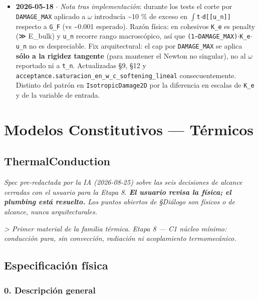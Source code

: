 \documentclass[11pt,letterpaper,oneside]{report}
\begin{document}
\begin{itemize}
  \item \textbf{2026-05-18} \ensuremath{\cdot} \textit{Nota tras implementación}: durante los tests el corte por \texttt{DAMAGE\_MAX} aplicado a \ensuremath{\omega} introducía \textasciitilde{}10 \% de exceso en \texttt{\ensuremath{\int}t\ensuremath{\cdot}d[[u\_n]]} respecto a \texttt{G\_F} (vs \textasciitilde{}0.001 esperado). Razón física: en cohesivos \texttt{K\_e} es penalty (≫ E\_bulk) y \texttt{u\_n} recorre rango macroscópico, así que \texttt{(1−DAMAGE\_MAX)\ensuremath{\cdot}K\_e\ensuremath{\cdot}u\_n} no es despreciable. Fix arquitectural: el cap por \texttt{DAMAGE\_MAX} se aplica \textbf{sólo a la rigidez tangente} (para mantener el Newton no singular), no al \texttt{\ensuremath{\omega}} reportado ni a \texttt{t\_n}. Actualizadas §9, §12 y \texttt{acceptance.saturacion\_en\_w\_c\_softening\_lineal} consecuentemente. Distinto del patrón en \texttt{IsotropicDamage2D} por la diferencia en escalas de \texttt{K\_e} y de la variable de entrada.
\end{itemize}


\newpage

\chapter{Modelos Constitutivos — Térmicos}

\section{ThermalConduction}



\textit{Spec pre-redactada por la IA (2026-08-25) sobre las seis decisiones de alcance cerradas con el usuario para la Etapa 8. \textbf{El usuario revisa la física; el plumbing está resuelto.} Los puntos abiertos de §Diálogo son físicos o de alcance, nunca arquitecturales.}

\textit{> Primer material de la familia térmica. Etapa 8 --- C1 núcleo mínimo: conducción pura, sin convección, radiación ni acoplamiento termomecánico.}



\section{Especificación física}

\subsection{0. Descripción general}
\end{document}
